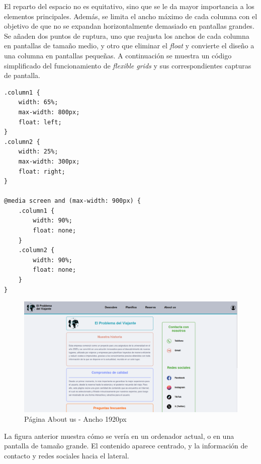 \documentclass[11pt, a4paper]{book}
\begin{document}
	El reparto del espacio no es equitativo, sino que se le da mayor importancia a los elementos principales. Además, se limita el ancho máximo de cada columna con el objetivo de que no se expandan horizontalmente demasiado en pantallas grandes. Se añaden dos puntos de ruptura, uno que reajusta los anchos de cada columna en pantallas de tamaño medio, y otro que eliminar el \textit{float} y convierte el diseño a una columna en pantallas pequeñas. A continuación se muestra un código simplificado del funcionamiento de \textit{flexible grids} y sus correspondientes capturas de pantalla.
	
	\begin{lstlisting}[]
.column1 {
	width: 65%;
	max-width: 800px;
	float: left;
}
.column2 {
	width: 25%;
	max-width: 300px;
	float: right;
}

@media screen and (max-width: 900px) {
	.column1 {
		width: 90%;
		float: none;
	}
	.column2 {
		width: 90%;
		float: none;
	}
}
	\end{lstlisting}

	\begin{figure} [H]
		\centering
		\includegraphics[width=\textwidth]{CSS/3-1 1920.png}
		\caption{Página About us - Ancho 1920px}
	\end{figure}

	La figura anterior muestra cómo se vería en un ordenador actual, o en una pantalla de tamaño grande. El contenido aparece centrado, y la información de contacto y redes sociales hacia el lateral.
	
\end{document}
